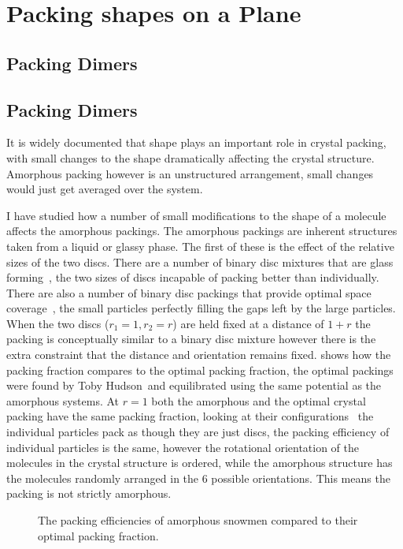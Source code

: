 \chapter{Packing shapes on a Plane}

\section{Packing Dimers}


\section{Packing Dimers}

It is widely documented that shape plays an important role in crystal packing\tocite, with small changes to the shape dramatically affecting the crystal structure. Amorphous packing however is an unstructured arrangement, small changes would just get averaged over the system.

I have studied how a number of small modifications to the shape of a molecule affects the amorphous packings. The amorphous packings are inherent structures taken from a liquid or glassy phase. The first of these is the effect of the relative sizes of the two discs. There are a number of binary disc mixtures that are glass forming~\tocite, the two sizes of discs incapable of packing better than individually. There are also a number of binary disc packings that provide optimal space coverage~\tocite, the small particles perfectly filling the gaps left by the large particles. When the two discs ($r_1 = 1, r_2 = r$) are held fixed at a distance of $1+r$ the packing is conceptually similar to a binary disc mixture however there is the extra constraint that the distance and orientation remains fixed.  shows how the packing fraction compares to the optimal packing fraction, the optimal packings were found by Toby Hudson~\tocite and equilibrated using the same potential as the amorphous systems\toref. At $r = 1$ both the amorphous and the optimal crystal packing have the same packing fraction, looking at their configurations~ the individual particles pack as though they are just discs, the packing efficiency of individual particles is the same, however the rotational orientation of the molecules in the crystal structure is ordered, while the amorphous structure has the molecules randomly arranged in the 6 possible orientations\tocheck. This means the packing is not strictly amorphous.

\begin{figure}
    \caption{The packing efficiencies of amorphous snowmen compared to their optimal packing fraction.}
    \label{fig:fix d var r}
\end{figure}

